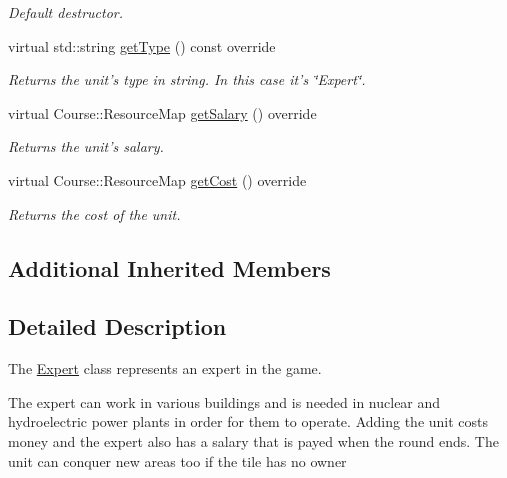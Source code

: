 \begin{DoxyCompactItemize}
\begin{DoxyCompactList}\small\item\em Default destructor. \end{DoxyCompactList}\item 
virtual std\-::string \hyperlink{class_student_1_1_expert_a103f30e0809cd26e7bafe4ef94a8673d}{get\-Type} () const override
\begin{DoxyCompactList}\small\item\em Returns the unit's type in string. In this case it's \char`\"{}\-Expert\char`\"{}. \end{DoxyCompactList}\item 
virtual Course\-::\-Resource\-Map \hyperlink{class_student_1_1_expert_a1e9298ad606390b2bf1d32937d119b0b}{get\-Salary} () override
\begin{DoxyCompactList}\small\item\em Returns the unit's salary. \end{DoxyCompactList}\item 
virtual Course\-::\-Resource\-Map \hyperlink{class_student_1_1_expert_a6701c9f8242ea9e326bcffada4ec0182}{get\-Cost} () override
\begin{DoxyCompactList}\small\item\em Returns the cost of the unit. \end{DoxyCompactList}\end{DoxyCompactItemize}
\subsection*{Additional Inherited Members}


\subsection{Detailed Description}
The \hyperlink{class_student_1_1_expert}{Expert} class represents an expert in the game. 

The expert can work in various buildings and is needed in nuclear and hydroelectric power plants in order for them to operate. Adding the unit costs money and the expert also has a salary that is payed when the round ends. The unit can conquer new areas too if the tile has no owner 

